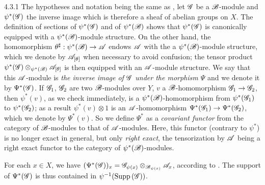 \begin{env}{4.3.1}
\label{env-0.4.3.1}
The hypotheses and notation being the same as , let $\mathscr{G}$ be
a $\mathscr{B}$-module and $\psi^*(\mathscr{G})$ the inverse image  which
is therefore a sheaf of abelian groups on $X$. The definition of sections of
$\psi^*(\mathscr{G})$ and of $\psi^*(\mathscr{B})$  shows that
$\psi^*(\mathscr{G})$ is canonically equipped with a $\psi^*(\mathscr{B})$-module
structure. On the other hand, the homomorphism
$\theta^\sharp:\psi^*(\mathscr{B})\to\mathscr{A}$ endows $\mathscr{A}$ with the a
$\psi^*(\mathscr{B})$-module structure, which we denote by $\mathscr{A}_{[\theta]}$ when
necessary to avoid confusion; the tensor product
$\psi^*(\mathscr{G})\otimes_{\psi^*(\mathscr{B})}\mathscr{A}_{[\theta]}$ is then equipped with
an $\mathscr{A}$-module structure. We say that this $\mathscr{A}$-module is \emph{the
inverse image of $\mathscr{G}$ under the morphism $\Psi$}
and we denote it by $\Psi^*(\mathscr{G})$. If $\mathscr{G}_1$, $\mathscr{G}_2$ are two
$\mathscr{B}$-modules over $Y$, $v$ a $\mathscr{B}$-homomorphism $\mathscr{G}_1\to\mathscr{G}_2$,
then $\psi^*(v)$, as we check immediately, is a $\psi^*(\mathscr{B})$-homomorphism
from $\psi^*(\mathscr{G}_1)$ to $\psi^*(\mathscr{G}_2)$; as a result $\psi^*(v)\otimes 1$
is an $\mathscr{A}$-homomorphism $\Psi^*(\mathscr{G}_1)\to\Psi^*(\mathscr{G}_2)$, which we
denote by $\Psi^*(v)$. So we define $\Psi^*$ as a \emph{covariant functor} from
the category of $\mathscr{B}$-modules to that of $\mathscr{A}$-modules. Here, this functor
(contrary to $\psi^*$) is no longer exact in general, but only \emph{right
exact}, the tensorization by $\mathscr{A}$ being a right exact functor to the
category of $\psi^*(\mathscr{B})$-modules.

For each $x\in X$, we have $(\Psi^*(\mathscr{G}))_x=\mathscr{G}_{\psi(x)}\otimes_{\mathscr{B}_{\psi(x)}}\mathscr{A}_x$,
according to . The support of $\Psi^*(\mathscr{G})$ is thus
contained in $\psi^{-1}({\mathop{\mathrm{Supp}}\nolimits}\,(\mathscr{G}))$.
\end{env}

